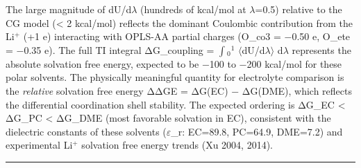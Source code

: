 \documentclass[
  11pt,
]{article}
\begin{document}
The large magnitude of dU/d\(\lambda\) (hundreds of kcal/mol at
\(\lambda\)=0.5) relative to the CG model (\textless{} 2 kcal/mol)
reflects the dominant Coulombic contribution from the Li\(^{+}\) (+1 e)
interacting with OPLS-AA partial charges (O\_co3 = −0.50 e, O\_ete =
−0.35 e). The full TI integral ΔG\_coupling = \(\int\)\(_{0}\)\(^{1}\)
\(\langle\)dU/d\(\lambda\)\(\rangle\) d\(\lambda\) represents the
absolute solvation free energy, expected to be −100 to −200 kcal/mol for
these polar solvents. The physically meaningful quantity for electrolyte
comparison is the \emph{relative} solvation free energy ΔΔGE = ΔG(EC) −
ΔG(DME), which reflects the differential coordination shell stability.
The expected ordering is ΔG\_EC \textless{} ΔG\_PC \textless{} ΔG\_DME
(most favorable solvation in EC), consistent with the dielectric
constants of these solvents (\(\varepsilon\)\_r: EC=89.8, PC=64.9,
DME=7.2) and experimental Li\(^{+}\) solvation free energy trends (Xu
2004, 2014).

\begin{center}\rule{0.5\linewidth}{0.5pt}\end{center}
\end{document}
